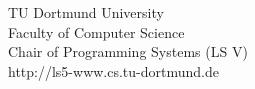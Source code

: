 \begin{titlepage}
\vspace*{2.5cm}
\hspace*{\links}
\begin{minipage}[b]{8cm}
\raggedright
TU Dortmund University \\
Faculty of Computer Science\\
Chair of Programming Systems (LS V)\\
http://ls5-www.cs.tu-dortmund.de
\end{minipage}

\end{titlepage}
